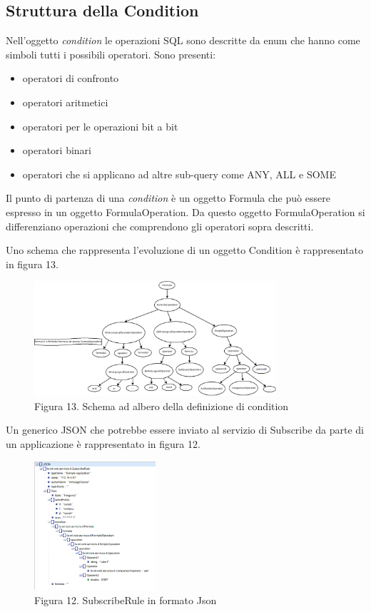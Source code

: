 \subsection{Struttura della Condition}
Nell'oggetto \textit{condition} le operazioni SQL sono descritte da enum che hanno come simboli tutti i possibili operatori. Sono presenti:
\begin{itemize}
	\item operatori di confronto
	\item operatori aritmetici
	\item operatori per le operazioni bit a bit
	\item operatori binari
	\item operatori che si applicano ad altre sub-query come ANY, ALL e SOME
\end{itemize}
Il punto di partenza di una \textit{condition} è un oggetto Formula che può essere espresso in un oggetto FormulaOperation. Da questo oggetto FormulaOperation si differenziano operazioni che comprendono gli operatori sopra descritti.

Uno schema che rappresenta l'evoluzione di un oggetto Condition è rappresentato in figura 13.
\begin{figure}[h]
	\centering
	\includegraphics[width=0.8\textwidth]{struttura-query-tree.png}
	\caption*{Figura 13. Schema ad albero della definizione di condition}
\end{figure}
\clearpage
Un generico JSON che potrebbe essere inviato al servizio di Subscribe da parte di un applicazione è rappresentato in figura 12.
\begin{figure}[H]
	\centering
	\includegraphics[width=0.4\textwidth]{subscribe-json-1.png}
	\caption*{Figura 12. SubscribeRule in formato Json}
\end{figure}

